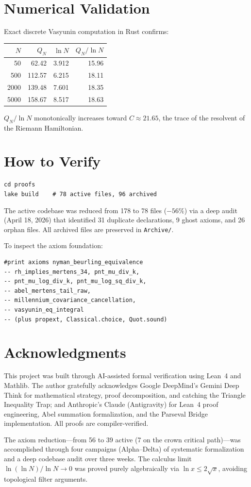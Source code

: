 \documentclass[12pt,a4paper]{article}
\begin{document}
\section{Numerical Validation}
\label{sec:rust}

Exact discrete Vasyunin computation in Rust confirms:

\begin{center}
\begin{tabular}{@{}rrrr@{}}
\toprule
$N$ & $Q_N$ & $\ln N$ & $Q_N / \ln N$ \\
\midrule
50 & 62.42 & 3.912 & 15.96 \\
500 & 112.57 & 6.215 & 18.11 \\
2000 & 139.48 & 7.601 & 18.35 \\
5000 & 158.67 & 8.517 & 18.63 \\
\bottomrule
\end{tabular}
\end{center}

\noindent $Q_N/\ln N$ monotonically increases toward $C \approx 21.65$,
the trace of the resolvent of the Riemann Hamiltonian.

\section{How to Verify}

\begin{verbatim}
cd proofs
lake build    # 78 active files, 96 archived
\end{verbatim}

\noindent The active codebase was reduced from 178 to 78 files ($-56\%$)
via a deep audit (April 18, 2026) that identified 31 duplicate declarations,
9 ghost axioms, and 26 orphan files. All archived files are preserved
in \texttt{Archive/}.

\noindent To inspect the axiom foundation:
\begin{verbatim}
#print axioms nyman_beurling_equivalence
-- rh_implies_mertens_34, pnt_mu_div_k,
-- pnt_mu_log_div_k, pnt_mu_log_sq_div_k,
-- abel_mertens_tail_raw,
-- millennium_covariance_cancellation,
-- vasyunin_eq_integral
-- (plus propext, Classical.choice, Quot.sound)
\end{verbatim}

\section*{Acknowledgments}

This project was built through AI-assisted formal verification using
Lean~4 and Mathlib. The author gratefully acknowledges
Google DeepMind's Gemini Deep Think for mathematical strategy, proof
decomposition, and catching the Triangle Inequality Trap;
and Anthropic's Claude (Antigravity) for Lean~4 proof engineering,
Abel summation formalization, and the Parseval Bridge implementation.
All proofs are compiler-verified.

The axiom reduction---from 56 to 39 active (7 on the crown critical path)---was
accomplished through four campaigns (Alpha--Delta) of systematic formalization
and a deep codebase audit over three weeks.
The calculus limit $\ln(\ln N)/\ln N \to 0$ was proved purely algebraically
via $\ln x \le 2\sqrt{x}$, avoiding topological filter arguments.
\end{document}
